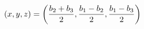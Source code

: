 \documentclass[preview]{standalone}
\begin{document}
\begin{align*}
\special{dvisvgm:raw <g id='unique000'>}(x,y,z)=\left(\frac{b_2+b_3}{2},\frac{b_1-b_2}{2},\frac{b_1-b_3}{2}\right)\special{dvisvgm:raw </g>}
\end{align*}
\end{document}
